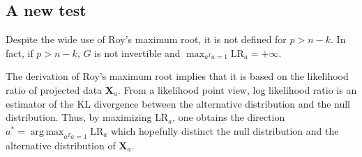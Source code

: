 \documentclass[12pt]{article} %
\DeclareMathOperator*{\argmax}{arg\,max}
\newcommand{\bX}{\mathbf{X}}
\newcommand{\bfsym}[1]{\ensuremath{\boldsymbol{#1}}}
\def\bSigma {\bfsym {\Sigma}}
\theoremstyle{definition}
\begin{document}


\subsection{A new test}
Despite the wide use of Roy's maximum root, it is not defined for $p> n-k$.
In fact, if $p>n-k$, $G$ is not invertible and $\max_{a^T a=1}\text{LR}_a=+\infty$. 

The derivation of Roy's maximum root implies that it is based on the likelihood ratio of projected data $\bX_a$.
From a likelihood point view, log likelihood ratio is an estimator of the KL divergence between the alternative distribution and the null distribution.
Thus, by maximizing $\text{LR}_a$, one obtains
the direction $a^*=\argmax_{a^T a=1}\text{LR}_a$ which hopefully distinct the null distribution and the alternative distribution of $\bX_a$. 


\end{document}
